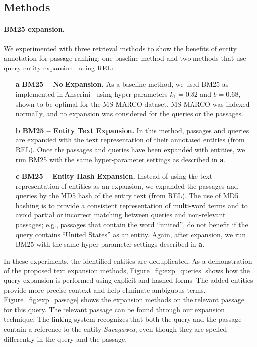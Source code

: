 \subsection{Methods}

\paragraph{BM25 expansion.} We experimented with three retrieval methods to show the benefits of entity annotation for passage ranking: one baseline method and two methods that use query entity expansion~\citep{Shehata} using REL:

\begin{itemize}
	\item[\textbf{a}] \textbf{BM25 -- No Expansion.} As a baseline method, we used BM25 as implemented in Anserini~\cite{Kamphuis2020BM25} using hyper-parameters $k_1=0.82$ and $b=0.68$, shown to be optimal for the MS MARCO dataset. MS MARCO was indexed normally, and no expansion was considered for the queries or the passages. 
	\item[\textbf{b}] \textbf{BM25 -- Entity Text Expansion.} In this method, passages and queries are expanded with the text representation of their annotated entities (from REL). Once the passages and queries have been expanded with entities, we run BM25 with the same hyper-parameter settings as described in \textbf{a}.
	\item[\textbf{c}] \textbf{BM25 -- Entity Hash Expansion.} Instead of using the text representation of entities as an expansion, we expanded the passages and queries by the MD5 hash of the entity text (from REL). The use of MD5 hashing is to provide a consistent representation of multi-word terms and to avoid partial or incorrect matching between queries and non-relevant passages; e.g., passages that contain the word ``united'', do not benefit if the query contains ``United States'' as an entity. Again, after expansion, we run BM25 with the same hyper-parameter settings described in \textbf{a}.
\end{itemize}
In these experiments, the identified entities are deduplicated. As a demonstration of the proposed text expansion methods, Figure~\ref{fig:exp_queries} shows how the query expansion is performed using explicit and hashed forms. The added entities provide more precise context and help eliminate ambiguous terms. Figure~\ref{fig:exp_passage} shows the expansion methods on the relevant passage for this query. The relevant passage can be found through our expansion technique. The linking system recognizes that both the query and the passage contain a reference to the entity \emph{Sacagawea}, even though they are spelled differently in the query and the passage.

